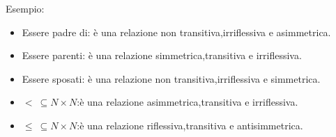 Esempio:
\begin{itemize}
    \item Essere padre di: è una relazione non transitiva,irriflessiva e asimmetrica.
    \item Essere parenti: è una relazione simmetrica,transitiva e irriflessiva.
    \item Essere sposati: è una relazione non transitiva,irriflessiva e simmetrica.
    \item $< \ \subseteq N \times N$:è una relazione asimmetrica,transitiva e irriflessiva.
    \item $\leq \ \subseteq N \times N$:è una relazione riflessiva,transitiva e antisimmetrica.
\end{itemize}
